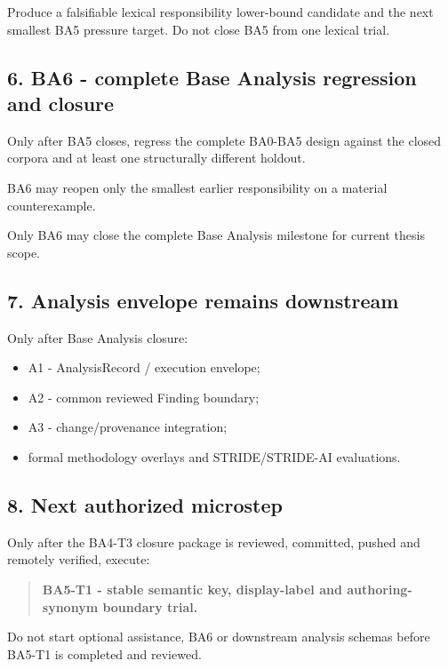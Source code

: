 \documentclass[
  11pt,
  a4paper,
]{article}
\providecommand{\tightlist}{%
  \setlength{\itemsep}{0pt}\setlength{\parskip}{0pt}}
\begin{document}
Produce a falsifiable lexical responsibility lower-bound candidate and
the next smallest BA5 pressure target. Do not close BA5 from one lexical
trial.

\subsection{6. BA6 - complete Base Analysis regression and
closure}\label{ba6---complete-base-analysis-regression-and-closure}

Only after BA5 closes, regress the complete BA0-BA5 design against the
closed corpora and at least one structurally different holdout.

BA6 may reopen only the smallest earlier responsibility on a material
counterexample.

Only BA6 may close the complete Base Analysis milestone for current
thesis scope.

\subsection{7. Analysis envelope remains
downstream}\label{analysis-envelope-remains-downstream}

Only after Base Analysis closure:

\begin{itemize}
\tightlist
\item
  A1 - AnalysisRecord / execution envelope;
\item
  A2 - common reviewed Finding boundary;
\item
  A3 - change/provenance integration;
\item
  formal methodology overlays and STRIDE/STRIDE-AI evaluations.
\end{itemize}

\subsection{8. Next authorized
microstep}\label{next-authorized-microstep}

Only after the BA4-T3 closure package is reviewed, committed, pushed and
remotely verified, execute:

\begin{quote}
\textbf{BA5-T1 - stable semantic key, display-label and
authoring-synonym boundary trial.}
\end{quote}

Do not start optional assistance, BA6 or downstream analysis schemas
before BA5-T1 is completed and reviewed.
\end{document}
